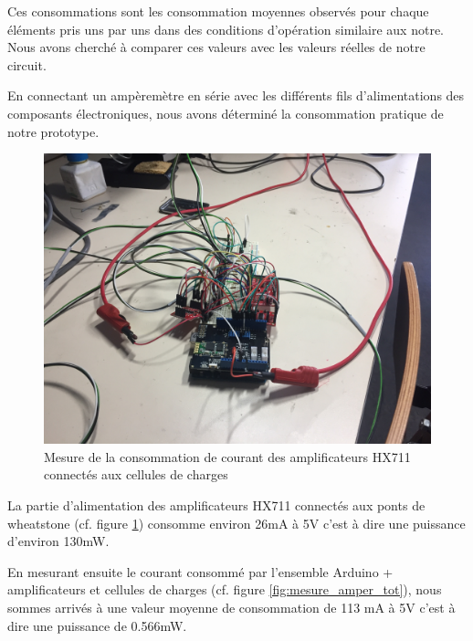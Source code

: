 \documentclass{polytech/polytech}
\begin{document}
Ces consommations sont les consommation moyennes observés pour chaque éléments pris uns par uns dans des conditions d'opération similaire aux notre. 
Nous avons cherché à comparer ces valeurs avec les valeurs réelles de notre circuit.

En connectant un ampèremètre en série avec les différents fils d'alimentations des composants électroniques, nous avons déterminé la consommation pratique de notre prototype.

\begin{figure}[htbp]
\begin{center}
\includegraphics[width=12cm]{image/mesure_de_consommation1}
\end{center}
\caption{Mesure de la consommation de courant des amplificateurs HX711 connectés aux cellules de charges}
\label{fig:mesure_amper_hx711}
\end{figure}

La partie d'alimentation des amplificateurs HX711 connectés aux ponts de wheatstone (cf. figure \ref{fig:mesure_amper_hx711}) consomme environ 26mA à 5V c'est à dire une puissance d'environ 130mW.

En mesurant ensuite le courant consommé par l'ensemble Arduino + amplificateurs et cellules de charges (cf. figure \ref{fig:mesure_amper_tot}), nous sommes arrivés à une valeur moyenne de consommation de 113 mA à 5V c'est à dire une puissance de 0.566mW.
\end{document}
